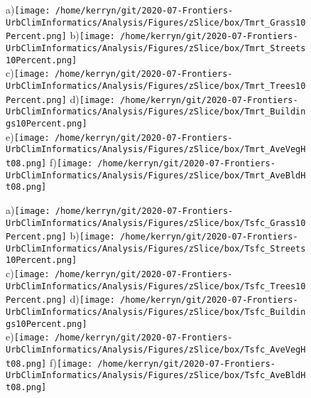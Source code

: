 \documentclass{article}
\begin{document}
\begin{figure}
\centering    
a)\texttt{[image: /home/kerryn/git/2020-07-Frontiers-UrbClimInformatics/Analysis/Figures/zSlice/box/Tmrt\_Grass10Percent.png]}
b)\texttt{[image: /home/kerryn/git/2020-07-Frontiers-UrbClimInformatics/Analysis/Figures/zSlice/box/Tmrt\_Streets10Percent.png]}\\
c)\texttt{[image: /home/kerryn/git/2020-07-Frontiers-UrbClimInformatics/Analysis/Figures/zSlice/box/Tmrt\_Trees10Percent.png]}
d)\texttt{[image: /home/kerryn/git/2020-07-Frontiers-UrbClimInformatics/Analysis/Figures/zSlice/box/Tmrt\_Buildings10Percent.png]}\\
e)\texttt{[image: /home/kerryn/git/2020-07-Frontiers-UrbClimInformatics/Analysis/Figures/zSlice/box/Tmrt\_AveVegHt08.png]}
f)\texttt{[image: /home/kerryn/git/2020-07-Frontiers-UrbClimInformatics/Analysis/Figures/zSlice/box/Tmrt\_AveBldHt08.png]}
\end{figure} 
\clearpage

\begin{figure}
\centering    
a)\texttt{[image: /home/kerryn/git/2020-07-Frontiers-UrbClimInformatics/Analysis/Figures/zSlice/box/Tsfc\_Grass10Percent.png]}
b)\texttt{[image: /home/kerryn/git/2020-07-Frontiers-UrbClimInformatics/Analysis/Figures/zSlice/box/Tsfc\_Streets10Percent.png]}\\
c)\texttt{[image: /home/kerryn/git/2020-07-Frontiers-UrbClimInformatics/Analysis/Figures/zSlice/box/Tsfc\_Trees10Percent.png]}
d)\texttt{[image: /home/kerryn/git/2020-07-Frontiers-UrbClimInformatics/Analysis/Figures/zSlice/box/Tsfc\_Buildings10Percent.png]}\\
e)\texttt{[image: /home/kerryn/git/2020-07-Frontiers-UrbClimInformatics/Analysis/Figures/zSlice/box/Tsfc\_AveVegHt08.png]}
f)\texttt{[image: /home/kerryn/git/2020-07-Frontiers-UrbClimInformatics/Analysis/Figures/zSlice/box/Tsfc\_AveBldHt08.png]}
\end{figure} 
\clearpage
\end{document}
